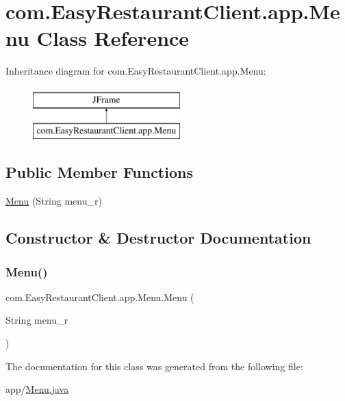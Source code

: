 \hypertarget{classcom_1_1_easy_restaurant_client_1_1app_1_1_menu}{}\section{com.\+Easy\+Restaurant\+Client.\+app.\+Menu Class Reference}
\label{classcom_1_1_easy_restaurant_client_1_1app_1_1_menu}
Inheritance diagram for com.\+Easy\+Restaurant\+Client.\+app.\+Menu\+:\begin{figure}[H]
\begin{center}
\leavevmode
\includegraphics[height=2.000000cm]{classcom_1_1_easy_restaurant_client_1_1app_1_1_menu}
\end{center}
\end{figure}
\subsection*{Public Member Functions}
\begin{DoxyCompactItemize}
\item 
\mbox{\hyperlink{classcom_1_1_easy_restaurant_client_1_1app_1_1_menu_af00355f85c10320f3323d44229080c2e}{Menu}} (String menu\+\_\+r)
\end{DoxyCompactItemize}


\subsection{Constructor \& Destructor Documentation}
\mbox{\label{classcom_1_1_easy_restaurant_client_1_1app_1_1_menu_af00355f85c10320f3323d44229080c2e}} 
\subsubsection{\texorpdfstring{Menu()}{Menu()}}
{\footnotesize\ttfamily com.\+Easy\+Restaurant\+Client.\+app.\+Menu.\+Menu (\begin{DoxyParamCaption}\item[{String}]{menu\+\_\+r }\end{DoxyParamCaption})}



The documentation for this class was generated from the following file\+:\begin{DoxyCompactItemize}
\item 
app/\mbox{\hyperlink{_menu_8java}{Menu.\+java}}\end{DoxyCompactItemize}
